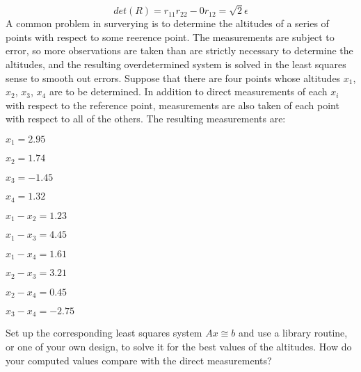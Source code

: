 \documentclass{jhwhw}
\begin{document}
\[
det(R) = r_{11}r_{22} - 0r_{12} = \sqrt{2}\epsilon
\]
A common problem in surverying is to determine the altitudes of a series of points with
respect to some reerence point. The measurements are subject to error, so more observations
are taken than are strictly necessary to determine the altitudes, and the resulting 
overdetermined system is solved in the least squares sense to smooth out errors. Suppose
that there are four points whose altitudes $x_1$, $x_2$, $x_3$, $x_4$ are to be determined.
In addition to direct measurements of each $x_i$ with respect to the reference point,
measurements are also taken of each point with respect to all of the others. The resulting 
measurements are:

\begin{multicols}{5}
  \begin{inparablank}
  \item \(x_1=2.95\)
  \item \(x_2=1.74\)
  \item \(x_3=-1.45\)
  \item \(x_4=1.32\)
  \item \(x_1 - x_2 = 1.23\)
  \item \(x_1 - x_3 = 4.45\)
  \item \(x_1 - x_4 = 1.61\)
  \item \(x_2 - x_3 = 3.21\)
  \item \(x_2 - x_4 = 0.45\)
  \item \(x_3 - x_4 = -2.75\)
  \end{inparablank}
\end{multicols}

Set up the corresponding least squares system \(Ax \cong b\) and use a library routine,
or one of your own design, to solve it for the best values of the altitudes. How do your
computed values compare with the direct measurements?


\end{document}
